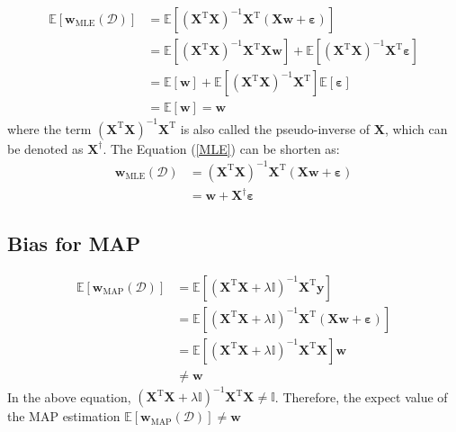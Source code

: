 \documentclass{article}
\begin{document}
\begin{equation}
    \begin{aligned}
        \mathbb{E}[\mathbf{w}_{\text{MLE}}(\mathcal{D})] 
        &= \mathbb{E}[(\mathbf{X}^{\mathrm{T}} \mathbf{X})^{-1} \mathbf{X}^{\mathrm{T}} (\mathbf{Xw} + \boldsymbol{\varepsilon})]\\
        &= \mathbb{E}[(\mathbf{X}^{\mathrm{T}} \mathbf{X})^{-1} \mathbf{X}^{\mathrm{T}} \mathbf{X} \mathbf{w}] + \mathbb{E}[(\mathbf{X}^{\mathrm{T}} \mathbf{X})^{-1} \mathbf{X}^{\mathrm{T}} \boldsymbol{\varepsilon}]\\
        &= \mathbb{E}[\mathbf{w}] + \mathbb{E}[(\mathbf{X}^{\mathrm{T}} \mathbf{X})^{-1} \mathbf{X}^{\mathrm{T}}] \mathbb{E}[\boldsymbol{\varepsilon}]\\
        &= \mathbb{E}[\mathbf{w}] = \mathbf{w}
    \end{aligned}
\end{equation}
where the term $(\mathbf{X}^{\mathrm{T}} \mathbf{X})^{-1} \mathbf{X}^{\mathrm{T}}$ is also called the pseudo-inverse of $\mathbf{X}$, which can be denoted as $\mathbf{X}^{\dag}$. The Equation (\ref{MLE}) can be shorten as:
\begin{equation}
    \begin{aligned}
        \mathbf{w}_{\text{MLE}}(\mathcal{D}) 
        &= (\mathbf{X}^{\mathrm{T}} \mathbf{X})^{-1} \mathbf{X}^{\mathrm{T}} (\mathbf{X}\mathbf{w} + \boldsymbol{\varepsilon})\\
        &= \mathbf{w} + \mathbf{X}^{\dag} \boldsymbol{\varepsilon}
    \end{aligned}
\end{equation}

\subsection{Bias for MAP}

\begin{equation}
    \begin{aligned}
        \mathbb{E}[\mathbf{w}_{\text{MAP}}(\mathcal{D})] 
        &= \mathbb{E}[(\mathbf{X}^{\mathrm{T}} \mathbf{X} + \lambda \mathbb{I})^{-1} \mathbf{X}^{\mathrm{T}} \mathbf{y}]\\
        &= \mathbb{E}[(\mathbf{X}^{\mathrm{T}} \mathbf{X} + \lambda \mathbb{I})^{-1} \mathbf{X}^{\mathrm{T}} (\mathbf{Xw} + \boldsymbol{\varepsilon})]\\
        &= \mathbb{E}[(\mathbf{X}^{\mathrm{T}} \mathbf{X} + \lambda \mathbb{I})^{-1} \mathbf{X}^{\mathrm{T}} \mathbf{X}]\mathbf{w}\\
        &\neq \mathbf{w}
    \end{aligned}
\end{equation}
In the above equation, $(\mathbf{X}^{\mathrm{T}} \mathbf{X} + \lambda \mathbb{I})^{-1} \mathbf{X}^{\mathrm{T}} \mathbf{X} \neq \mathbb{I}$. Therefore, the expect value of the MAP estimation $\mathbb{E}[\mathbf{w}_{\text{MAP}}(\mathcal{D})] \neq \mathbf{w}$
\end{document}
